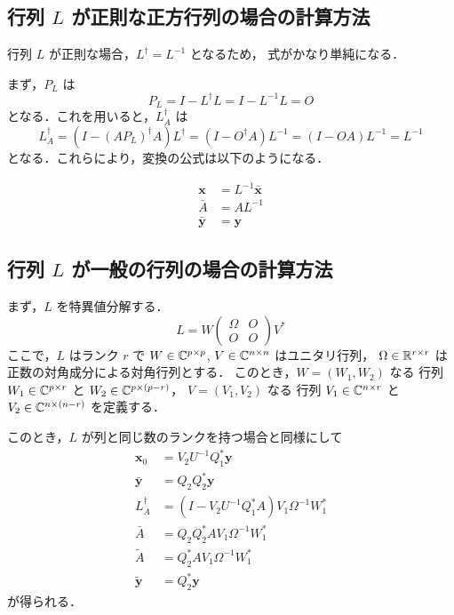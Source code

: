 \subsection[行列 L が正則な正方行列の場合の計算方法]{行列 $L$ が正則な正方行列の場合の計算方法}

行列 $L$ が正則な場合，$L^\dagger = L^{-1}$ となるため，
式がかなり単純になる．

まず，$P_L$ は
\begin{equation}
    P_L = I - L^\dagger L = I - L^{-1} L = O
\end{equation}
となる．これを用いると，$L_A^\dagger$ は
\begin{equation}
    L_A^\dagger = \left(I - \left(A P_L\right)^\dagger A\right) L^\dagger
    = \left(I - O^{\dagger} A\right) L^{-1}
    = \left(I - O A\right) L^{-1}
    = L^{-1}
\end{equation}
となる．これらにより，変換の公式は以下のようになる．

\begin{align}
    \bm{x}       & = L^{-1} \bar{\bm{x}} \\
    \bar{A}      & = A L^{-1}            \\
    \bar{\bm{y}} & = \bm{y}
\end{align}

\subsection[行列 L が一般の行列の場合の計算方法]{行列 $L$ が一般の行列の場合の計算方法}

まず，$L$ を特異値分解する．
\begin{equation}
    L = W
    \begin{pmatrix}
        \Omega & O \\
        O      & O
    \end{pmatrix}
    V^*
\end{equation}
ここで，$L$ はランク $r$ で
$W \in \mathbb{C}^{p \times p}$,
$V \in \mathbb{C}^{n \times n}$
はユニタリ行列，
$\Omega \in \mathbb{R}^{r \times r}$
は正数の対角成分による対角行列とする．
このとき，$W = (W_1, W_2)$ なる
行列 $W_1 \in \mathbb{C}^{p \times r}$ と $W_2 \in \mathbb{C}^{p \times (p-r)}$，
$V = (V_1, V_2)$ なる
行列 $V_1 \in \mathbb{C}^{n \times r}$ と $V_2 \in \mathbb{C}^{n \times (n-r)}$
を定義する．

このとき，$L$ が列と同じ数のランクを持つ場合と同様にして
\begin{align}
    \bm{x}_0       & = V_2 U^{-1} Q_1^* \bm{y}                        \\
    \bar{\bm{y}}   & = Q_2 Q_2^* \bm{y}                               \\
    L_A^\dagger    & = (I - V_2 U^{-1} Q_1^* A) V_1 \Omega^{-1} W_1^* \\
    \bar{A}        & = Q_2 Q_2^* A V_1 \Omega^{-1} W_1^*              \\
    \tilde{A}      & = Q_2^* A V_1 \Omega^{-1} W_1^*                  \\
    \tilde{\bm{y}} & = Q_2^* \bm{y}
\end{align}
が得られる．
